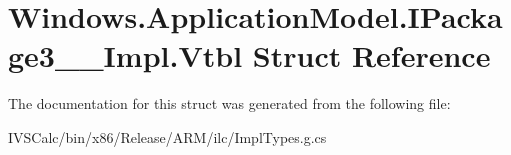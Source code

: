 \hypertarget{struct_windows_1_1_application_model_1_1_i_package3_____impl_1_1_vtbl}{}\section{Windows.\+Application\+Model.\+I\+Package3\+\_\+\+\_\+\+Impl.\+Vtbl Struct Reference}
\label{struct_windows_1_1_application_model_1_1_i_package3_____impl_1_1_vtbl}


The documentation for this struct was generated from the following file\+:\begin{DoxyCompactItemize}
\item 
I\+V\+S\+Calc/bin/x86/\+Release/\+A\+R\+M/ilc/Impl\+Types.\+g.\+cs\end{DoxyCompactItemize}
